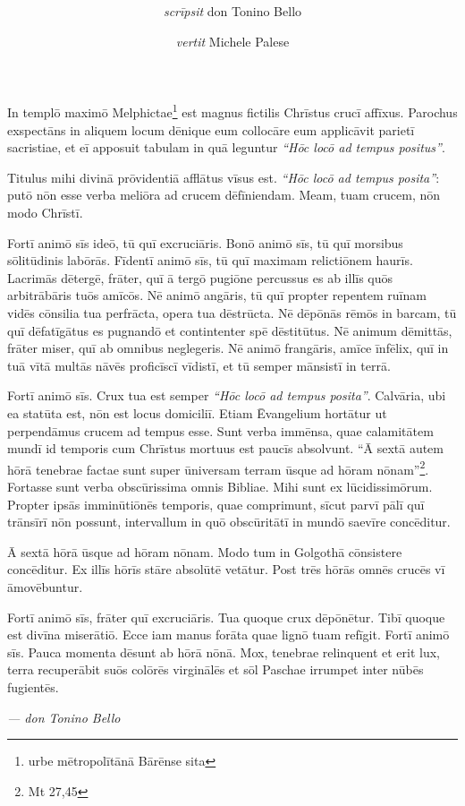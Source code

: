 \documentclass[a4paper, 11pt]{article}
\title{
	\Huge{\MyTitle}
}
\author{
	\textit{scrīpsit} don Tonino Bello \and \textit{vertit} Michele Palese
}
\date{}
\begin{document}
	\maketitle
	
	In templō maximō Melphictae\footnote{urbe mētropolītānā Bārēnse sita} est magnus fictilis Chrīstus crucī affīxus.
	Parochus exspectāns in aliquem locum dēnique eum collocāre eum applicāvit parietī sacristiae, et eī apposuit tabulam in quā leguntur \textit{``Hōc locō ad tempus positus''}.
	
	Titulus mihi divinā prōvidentiā afflātus vīsus est.
	\textit{``Hōc locō ad tempus posita''}: putō nōn esse verba meliōra ad crucem dēfīniendam.
	Meam, tuam crucem, nōn modo Chrīstī.
	
	Fortī animō sīs ideō, tū quī excruciāris.
	Bonō animō sīs, tū quī morsibus sōlitūdinis labōrās.
	Fīdentī animō sīs, tū quī maximam relictiōnem haurīs.
	Lacrimās dētergē, frāter, quī ā tergō pugiōne percussus es ab illīs quōs arbitrābāris tuōs amīcōs.
	Nē animō angāris, tū quī propter repentem ruīnam vidēs cōnsilia tua perfrācta, opera tua dēstrūcta.
	Nē dēpōnās rēmōs in barcam, tū quī dēfatīgātus es pugnandō et contintenter spē dēstitūtus.
	Nē animum dēmittās, frāter miser, quī ab omnibus neglegeris.
	Nē animō frangāris, amīce īnfēlix, quī in tuā vītā multās nāvēs proficīscī vīdistī, et tū semper mānsistī in terrā.
	
	Fortī animō sīs. Crux tua est semper \textit{``Hōc locō ad tempus posita''}.
	Calvāria, ubi ea statūta est, nōn est locus domiciliī.
	Etiam Ēvangelium hortātur ut perpendāmus crucem ad tempus esse.
	Sunt verba immēnsa, quae calamitātem mundī id temporis cum Chrīstus mortuus est paucīs absolvunt.
	``Ā sextā autem hōrā tenebrae factae sunt super ūniversam terram ūsque ad hōram nōnam''\footnote{Mt 27,45}.
	Fortasse sunt verba obscūrissima omnis Bibliae.
	Mihi sunt ex lūcidissimōrum. Propter ipsās imminūtiōnēs temporis, quae
	comprimunt, sīcut parvī pālī quī trānsīrī nōn possunt, intervallum in
	quō obscūritātī in mundō saevīre concēditur.
	
	Ā sextā hōrā ūsque ad hōram nōnam. Modo tum in Golgothā cōnsistere
	concēditur. Ex illīs hōrīs stāre absolūtē vetātur. Post trēs hōrās omnēs
	crucēs vī āmovēbuntur.
	
	Fortī animō sīs, frāter quī excruciāris.
	Tua quoque crux dēpōnētur.
	Tibī quoque est divīna miserātiō.
	Ecce iam manus forāta quae lignō tuam refīgit.
	Fortī animō sīs.
	Pauca momenta dēsunt ab hōrā nōnā.
	Mox, tenebrae relinquent et erit lux, terra recuperābit suōs colōrēs virginālēs et sōl Paschae irrumpet inter nūbēs fugientēs.
	
	\bigskip
	
	\raggedleft \textit{--- don Tonino Bello} \hspace{1em}
\end{document}
